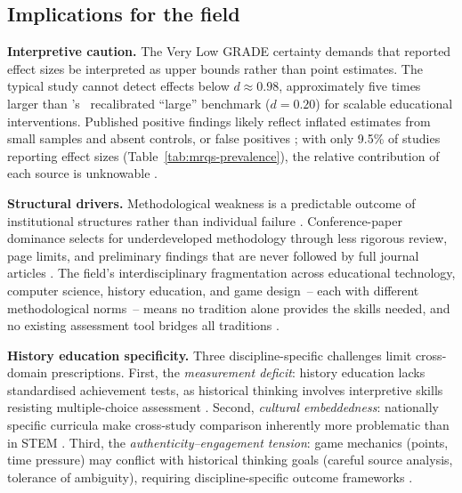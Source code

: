 \subsection{Implications for the field} \label{sec:implications-field}

\textbf{Interpretive caution.} \label{sec:interpretive-caution} The Very Low GRADE certainty demands that reported effect sizes be interpreted as upper bounds rather than point estimates. The typical study cannot detect effects below $d \approx 0.98$, approximately five times larger than \citeauthor{Kraft2020}'s~\cite{Kraft2020} recalibrated ``large'' benchmark ($d = 0.20$) for scalable educational interventions. Published positive findings likely reflect inflated estimates from small samples and absent controls, or false positives \cite{Ioannidis2005}; with only 9.5\% of studies reporting effect sizes (Table~\ref{tab:mrqs-prevalence}), the relative contribution of each source is unknowable \cite{Korniienko2025mrqs, Hattie2009}.

\textbf{Structural drivers.} \label{sec:structural-drivers} Methodological weakness is a predictable outcome of institutional structures rather than individual failure \cite{Chalmers2009}. Conference-paper dominance selects for underdeveloped methodology through less rigorous review, page limits, and preliminary findings that are never followed by full journal articles \cite{Korniienko2025mrqs}. The field's interdisciplinary fragmentation across educational technology, computer science, history education, and game design~-- each with different methodological norms~-- means no tradition alone provides the skills needed, and no existing assessment tool bridges all traditions \cite{CookReed2015, Glasziou2014}.

\textbf{History education specificity.} \label{sec:history-specificity} Three discipline-specific challenges limit cross-domain prescriptions. First, the \emph{measurement deficit}: history education lacks standardised achievement tests, as historical thinking involves interpretive skills resisting multiple-choice assessment \cite{MonteSano2012, Reisman2012, Crymble2021}. Second, \emph{cultural embeddedness}: nationally specific curricula make cross-study comparison inherently more problematic than in STEM \cite{Wild2022, Torgerson202237}. Third, the \emph{authenticity--engagement tension}: game mechanics (points, time pressure) may conflict with historical thinking goals (careful source analysis, tolerance of ambiguity), requiring discipline-specific outcome frameworks \cite{Ditlmann2025, Clark2016}.

